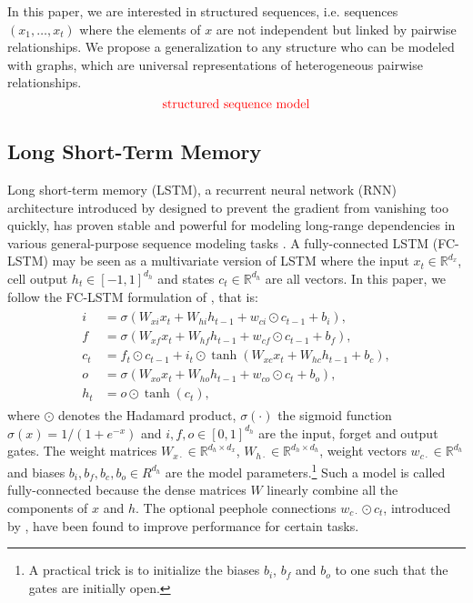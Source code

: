 \documentclass{article} %
\newcommand{\R}{\mathbb{R}}
\newcommand{\todo}[1]{{\color{red} #1 }}
\begin{document}
In this paper, we are interested in structured sequences, i.e. sequences $(x_1,
\ldots, x_t)$ where the elements of $x$ are not independent but linked by
pairwise relationships. We propose a generalization to any structure who can be
modeled with graphs, which are universal representations of heterogeneous
pairwise relationships.
\begin{equation} \label{eqn:seq_struct}
	\todo{\text{structured sequence model}}
\end{equation}

\subsection{Long Short-Term Memory}

Long short-term memory (LSTM), a recurrent neural network (RNN) architecture
introduced by \citet{lstm} designed to prevent the gradient from vanishing too
quickly, has proven stable and powerful for modeling long-range dependencies in
various general-purpose sequence modeling tasks \citep{seq_graves, seq2seq}. A
fully-connected LSTM (FC-LSTM) may be seen as a multivariate version of LSTM
where the input $x_t \in \R^{d_x}$, cell output $h_t \in [-1,1]^{d_h}$ and
states $c_t \in \R^{d_h}$ are all vectors. In this paper, we follow the FC-LSTM
formulation of \citet{convlstm}, that is:
\begin{align} \label{eqn:lstm_fc}
\begin{split}
	i &= \sigma(W_{xi} x_t + W_{hi} h_{t-1} + w_{ci} \odot c_{t-1} + b_i), \\
	f &= \sigma(W_{xf} x_t + W_{hf} h_{t-1} + w_{cf} \odot c_{t-1} + b_f), \\
	c_t &= f_t \odot c_{t-1} + i_t \odot \tanh(W_{xc} x_t + W_{hc} h_{t-1} + b_c), \\
	o &= \sigma(W_{xo} x_t + W_{ho} h_{t-1} + w_{co} \odot c_t + b_o), \\
	h_t &= o \odot \tanh(c_t),
\end{split}
\end{align}
where $\odot$ denotes the Hadamard product, $\sigma(\cdot)$ the sigmoid
function $\sigma(x) = 1 / (1+e^{-x})$ and $i, f, o \in [0,1]^{d_h}$ are the
input, forget and output gates. The weight matrices $W_{x\cdot} \in \R^{d_h
\times d_x}$, $W_{h\cdot} \in \R^{d_h \times d_h}$, weight vectors $w_{c\cdot}
\in \R^{d_h}$ and biases $b_i, b_f, b_c, b_o \in R^{d_h}$ are the model
parameters.\footnote{A practical trick is to initialize the biases $b_i$, $b_f$
and $b_o$ to one such that the gates are initially open.} 
Such a model is called fully-connected because the dense matrices $W$ linearly combine all the components of $x$ and $h$.
The optional peephole connections $w_{c\cdot} \odot c_t$, introduced by \citet{peephole}, have been found to improve performance for certain tasks.
\end{document}
